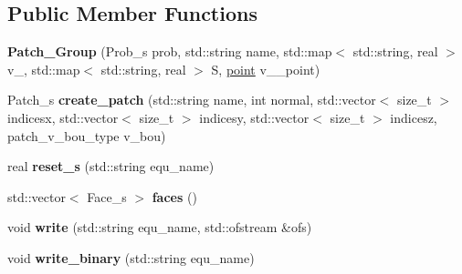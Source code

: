 \subsection*{Public Member Functions}
\begin{DoxyCompactItemize}
\item 
\hypertarget{classPatch__Group_ab92025ed00f68a9f96bc40621aa6df95}{{\bfseries Patch\+\_\+\+Group} (Prob\+\_\+s prob, std\+::string name, std\+::map$<$ std\+::string, real $>$ v\+\_, std\+::map$<$ std\+::string, real $>$ S, \hyperlink{structpoint}{point} v\+\_\+\_\+point)}\label{classPatch__Group_ab92025ed00f68a9f96bc40621aa6df95}

\item 
\hypertarget{classPatch__Group_abb0f6e18c5833efbe20634c1e4aabe9b}{Patch\+\_\+s {\bfseries create\+\_\+patch} (std\+::string name, int normal, std\+::vector$<$ size\+\_\+t $>$ indicesx, std\+::vector$<$ size\+\_\+t $>$ indicesy, std\+::vector$<$ size\+\_\+t $>$ indicesz, patch\+\_\+v\+\_\+bou\+\_\+type v\+\_\+bou)}\label{classPatch__Group_abb0f6e18c5833efbe20634c1e4aabe9b}

\item 
\hypertarget{classPatch__Group_ada9f56e3be9279ff5d555f2192cfc45b}{real {\bfseries reset\+\_\+s} (std\+::string equ\+\_\+name)}\label{classPatch__Group_ada9f56e3be9279ff5d555f2192cfc45b}

\item 
\hypertarget{classPatch__Group_a326628f83583bb2194f8c82548e9b6b3}{std\+::vector$<$ Face\+\_\+s $>$ {\bfseries faces} ()}\label{classPatch__Group_a326628f83583bb2194f8c82548e9b6b3}

\item 
\hypertarget{classPatch__Group_a3de7d3df9923795d4cbfa4d908e53598}{void {\bfseries write} (std\+::string equ\+\_\+name, std\+::ofstream \&ofs)}\label{classPatch__Group_a3de7d3df9923795d4cbfa4d908e53598}

\item 
\hypertarget{classPatch__Group_a5e59eb697dae5a0bdd75085af512c83b}{void {\bfseries write\+\_\+binary} (std\+::string equ\+\_\+name)}\label{classPatch__Group_a5e59eb697dae5a0bdd75085af512c83b}

\end{DoxyCompactItemize}
